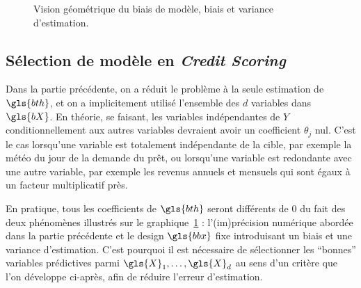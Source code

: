 \begin{figure}
\begin{center}
{
}
\end{center}
\caption{\label{fig:projection2} Vision géométrique du biais de modèle, biais et variance d'estimation.}
\end{figure}

\subsection{Sélection de modèle en \textit{Credit Scoring}}

Dans la partie précédente, on a réduit le problème à la seule estimation de $\gls{bth}$, et on a implicitement utilisé l'ensemble des $d$ variables dans $\gls{bX}$. En théorie, se faisant, les variables indépendantes de $Y$ conditionnellement aux autres variables devraient avoir un coefficient $\theta_j$ nul. C'est le cas lorsqu'une variable est totalement indépendante de la cible, par exemple la météo du jour de la demande du prêt, ou lorsqu'une variable est redondante avec une autre variable, par exemple les revenus annuels et mensuels qui sont égaux à un facteur multiplicatif près.

En pratique, tous les coefficients de $\gls{bth}$ seront différents de $0$ du fait des deux phénomènes illustrés sur le graphique~\ref{fig:projection2} : l'(im)précision numérique abordée dans la partie précédente et le design $\gls{bbx}$ fixe introduisant un biais et une variance d'estimation. C'est pourquoi il est nécessaire de sélectionner les ``bonnes'' variables prédictives parmi $\gls{X}_1,\dots,\gls{X}_d$ au sens d'un critère que l'on développe ci-après, afin de réduire l'erreur d'estimation.

